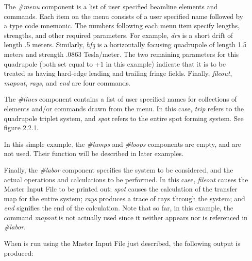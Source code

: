 The {\em \#menu} component is a list of user specified beamline elements and
commands.  Each item on the menu consists of a user specified name followed
by a \Mary type code mnemonic.  The numbers following each menu item
specify lengths, strengths, and other required parameters.  For example,
{\em drs } is a short drift of length .5 meters.  Similarly, {\em hfq }is a horizontally
focusing quadrupole of length 1.5 meters and strength .0863 Tesla/meter.
The two remaining parameters for this quadrupole (both set equal to +1 in
this example) indicate that it is to be treated as having hard-edge leading
and trailing fringe fields.  Finally, {\em fileout}, {\em mapout}, {\em rays}, and {\em end }are four commands.

The {\em \#lines} component contains a list of user specified names for
collections of elements and/or commands drawn from the menu.  In this case,
{\em trip } refers to the quadrupole triplet system, and {\em spot } refers to the entire
spot forming system.  See figure 2.2.1.

     In this simple example, the {\em \#lumps} and {\em \#loops} components are empty,
and are not used.  Their function will be described in later examples.

Finally, the {\em \#labor} component specifies the system to be considered, and
the actual operations and calculations to be performed.  In this case,
{\em fileout } causes the Master Input File to be printed out; {\em spot } causes the
calculation of the transfer map for the entire system; {\em rays } produces a
trace of rays through the system; and {\em end } signifies the end of the
calculation.  Note that so far, in this example, the command {\em mapout } is not
actually used since it neither appears nor is referenced in {\em \#labor}.

When  is run using the Master Input File just described,
the following output is produced:

